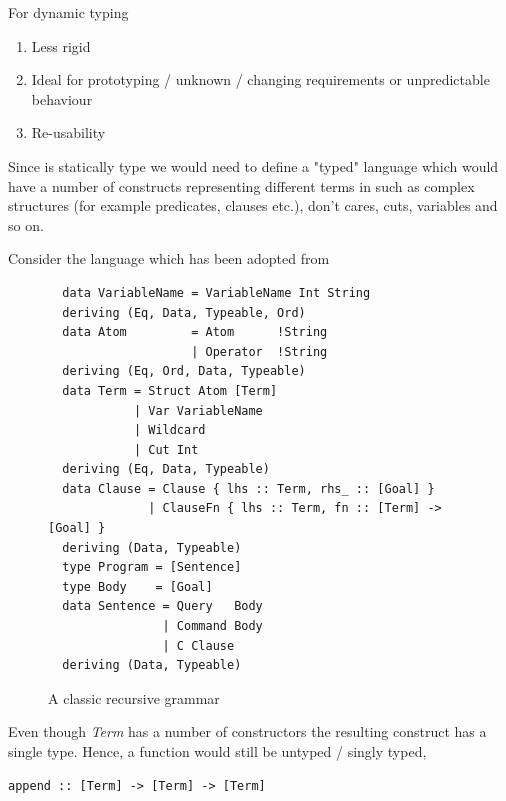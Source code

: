 \documentclass[thesis-solanki.tex]{subfiles}
\begin{document}
For dynamic typing
\begin{enumerate}
\item Less rigid
\item Ideal for prototyping / unknown / changing requirements or unpredictable behaviour
\item Re-usability
\end{enumerate}

Since  is statically type we would need to define a "typed" language which would have a
number of constructs representing different terms in  such as complex structures (for example
predicates, clauses etc.), don't cares, cuts, variables and so on.

Consider the language  which has been adopted from
\cite{prolog-lib}

\begin{figure}
\begin{verbatim}
  data VariableName = VariableName Int String
  deriving (Eq, Data, Typeable, Ord)
  data Atom         = Atom      !String
                    | Operator  !String
  deriving (Eq, Ord, Data, Typeable)
  data Term = Struct Atom [Term]
            | Var VariableName
            | Wildcard
            | Cut Int
  deriving (Eq, Data, Typeable)
  data Clause = Clause { lhs :: Term, rhs_ :: [Goal] }
              | ClauseFn { lhs :: Term, fn :: [Term] -> [Goal] }
  deriving (Data, Typeable)
  type Program = [Sentence]
  type Body    = [Goal]
  data Sentence = Query   Body
                | Command Body
                | C Clause
  deriving (Data, Typeable)
\end{verbatim}
  \caption{A classic recursive grammar}
  \label{tab:closed-terms}
\end{figure}

Even though \textit{Term} has a number of constructors the resulting construct has a single type. Hence, a function would still be untyped
/ singly typed,\par
\begin{verbatim}
append :: [Term] -> [Term] -> [Term]
\end{verbatim}

\end{document}
